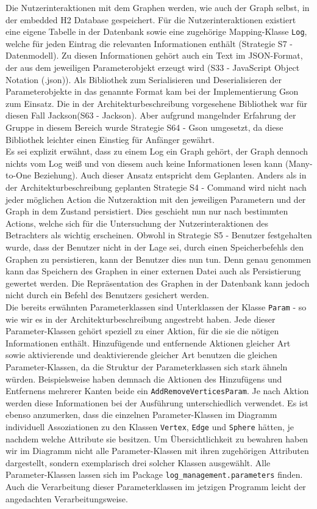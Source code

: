 \documentclass[enabledeprecatedfontcommands,fontsize=11pt,paper=a4,twoside]{scrartcl}
\newcounter{one}
\begin{document}
Die Nutzerinteraktionen mit dem Graphen werden, wie auch der Graph selbst, in der embedded H2 Database gespeichert. Für die Nutzerinteraktionen existiert eine eigene Tabelle in der Datenbank sowie eine zugehörige Mapping-Klasse \texttt{Log}, welche für jeden Eintrag die relevanten Informationen enthält (Strategie S7 - Datenmodell). Zu diesen Informationen gehört auch ein Text im JSON-Format, der aus dem jeweiligen Parameterobjekt erzeugt wird (S33 - JavaScript Object Notation (.json)). Als Bibliothek zum Serialisieren und Deserialisieren der Parameterobjekte in das genannte Format kam bei der Implementierung Gson zum Einsatz. Die in der Architekturbeschreibung vorgesehene Bibliothek war für diesen Fall Jackson(S63 - Jackson). Aber aufgrund mangelnder Erfahrung der Gruppe in diesem Bereich wurde Strategie S64 - Gson umgesetzt, da diese Bibliothek leichter einen Einstieg für Anfänger gewährt.\\
Es sei explizit erwähnt, dass zu einem Log ein Graph gehört, der Graph dennoch nichts vom Log weiß und von diesem auch keine Informationen lesen kann (Many-to-One Beziehung). Auch dieser Ansatz entspricht dem Geplanten. Anders als in der Architekturbeschreibung geplanten Strategie S4 - Command wird nicht nach jeder möglichen Action die Nutzeraktion mit den jeweiligen Parametern und der Graph in dem Zustand persistiert. Dies geschieht nun nur nach bestimmten Actions, welche sich für die Untersuchung der Nutzerinteraktionen des Betrachters als wichtig erscheinen. Obwohl in Strategie S5 - Benutzer festgehalten wurde, dass der Benutzer nicht in der Lage sei, durch einen Speicherbefehls den Graphen zu persistieren, kann der Benutzer dies nun tun. Denn genau genommen kann das Speichern des Graphen in einer externen Datei auch als Persistierung gewertet werden. Die Repräsentation des Graphen in der Datenbank kann jedoch nicht durch ein Befehl des Benutzers gesichert werden.\\
Die bereits erwähnten Parameterklassen sind Unterklassen der Klasse \texttt{Param} - so wie wir es in der Architekturbeschreibung angestrebt haben. Jede dieser Parameter-Klassen gehört speziell zu einer Aktion, für die sie die nötigen Informationen enthält. Hinzufügende und entfernende Aktionen gleicher Art sowie aktivierende und deaktivierende gleicher Art benutzen die gleichen Parameter-Klassen, da die Struktur der Parameterklassen sich stark ähneln würden. Beispielsweise haben demnach die Aktionen des Hinzufügens und Entfernens mehrerer Kanten beide ein \texttt{AddRemoveVerticesParam}. Je nach Aktion werden diese Informationen bei der Ausführung unterschiedlich verwendet. Es ist ebenso anzumerken, dass die einzelnen Parameter-Klassen im Diagramm individuell Assoziationen zu den Klassen \texttt{Vertex}, \texttt{Edge} und \texttt{Sphere} hätten, je nachdem welche Attribute sie besitzen. Um Übersichtlichkeit zu bewahren haben wir im Diagramm nicht alle Parameter-Klassen mit ihren zugehörigen Attributen dargestellt, sondern exemplarisch drei solcher Klassen ausgewählt. Alle Parameter-Klassen lassen sich im Package \texttt{log\_management.parameters} finden. Auch die Verarbeitung dieser Parameterklassen im jetzigen Programm leicht der angedachten Verarbeitungsweise. \\
\end{document}
